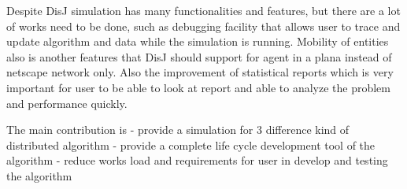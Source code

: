 Despite DisJ simulation has many functionalities and features, but there are a lot of works need to be done, such as debugging facility that allows user to trace and update algorithm and data while the simulation is running. Mobility of entities also is another features that DisJ should support for agent in a plana instead of netscape network only. Also the improvement of statistical reports which is very important for user to be able to look at report and able to analyze the problem and performance quickly.

The main contribution is 
- provide a simulation for 3 difference kind of distributed algorithm
- provide a complete life cycle development tool of the algorithm
- reduce works load and requirements for user in develop and testing the algorithm